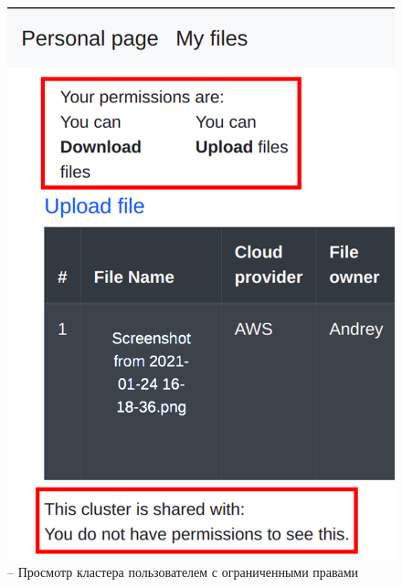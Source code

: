 \begin{figure}[H]
    \centering
    \includegraphics[scale=0.6]{images/mvp/4_SharedCluster.png}
    \caption{-- Просмотр кластера пользователем с ограниченными правами}
    \label{sharedCluster}
\end{figure}

